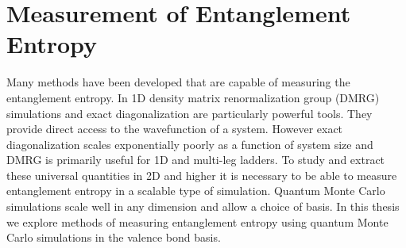 \section{Measurement of Entanglement Entropy}

Many methods have been developed that are capable of measuring the entanglement entropy. In 1D density matrix renormalization group (DMRG) simulations and exact diagonalization are particularly powerful tools. They provide direct access to the wavefunction of a system. However exact diagonalization scales exponentially poorly as a function of system size and DMRG is primarily useful for 1D and multi-leg ladders. To study and extract these universal quantities in 2D and higher it is necessary to be able to measure entanglement entropy in a scalable type of simulation. 
Quantum Monte Carlo simulations scale well in any dimension and allow a choice of basis. 
In this thesis we explore methods of measuring entanglement entropy using quantum Monte Carlo simulations in the valence bond basis.



